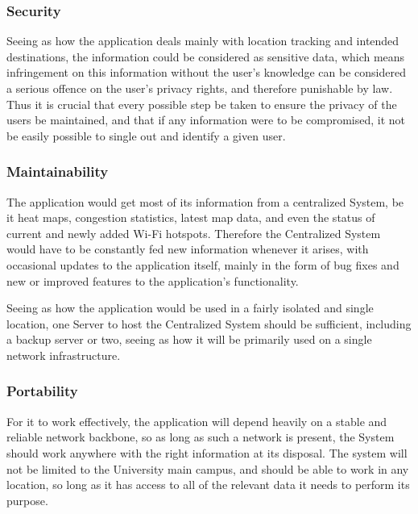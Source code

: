\documentclass[12pt]{article}
\begin{document}
		\subsubsection{Security}
		Seeing as how the application deals mainly with location tracking and intended destinations, the information could be considered as sensitive data, which means infringement on this information without the user’s knowledge can be considered a serious offence on the user’s privacy rights, and therefore punishable by law.  Thus it is crucial that every possible step be taken to ensure the privacy of the users be maintained, and that if any information were to be compromised, it not be easily possible to single out and identify a given user.  
		
		\subsubsection{Maintainability}
		The application would get most of its information from a centralized System, be it heat maps, congestion statistics, latest map data, and even the status of current and newly added Wi-Fi hotspots.  Therefore the Centralized System would have to be constantly fed new information whenever it arises, with occasional updates to the application itself, mainly in the form of bug fixes and new or improved features to the application’s functionality.  
		
		Seeing as how the application would be used in a fairly isolated and single location, one Server to host the Centralized System should be sufficient, including a backup server or two, seeing as how it will be primarily used on a single network infrastructure.  
		
		\subsubsection{Portability}
		For it to work effectively, the application will depend heavily on a stable and reliable network backbone, so as long as such a network is present, the System should work anywhere with the right information at its disposal.  The system will not be limited to the University main campus, and should be able to work in any location, so long as it has access to all of the relevant data it needs to perform its purpose.  
		
			
\end{document}
